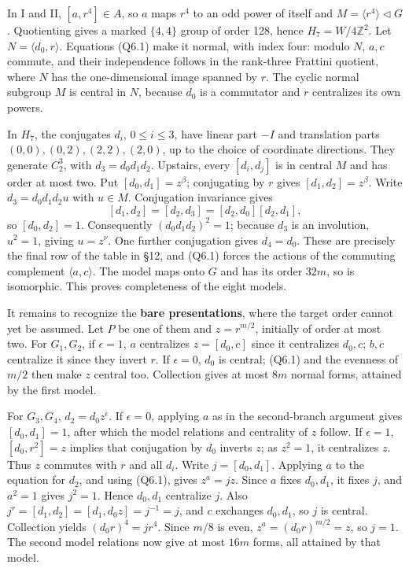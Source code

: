 \documentclass[
  10pt,
  letterpaper,
]{article}
\begin{document}
In I and II, \([a,r^4]\in A\), so \(a\) maps \(r^4\) to an odd power of
itself and \(M=\langle r^4\rangle\lhd G\). Quotienting gives a marked
\(\{4,4\}\) group of order 128, hence \(H_7=W/4\mathbb Z^2\). Let
\(N=\langle d_0,r\rangle\). Equations (Q6.1) make it normal, with index
four: modulo \(N\), \(a,c\) commute, and their independence follows in
the rank-three Frattini quotient, where \(N\) has the one-dimensional
image spanned by \(r\). The cyclic normal subgroup \(M\) is central in
\(N\), because \(d_0\) is a commutator and \(r\) centralizes its own
powers.

In \(H_7\), the conjugates \(d_i\), \(0\le i\le3\), have linear part
\(-I\) and translation parts \((0,0),(0,2),(2,2),(2,0)\), up to the
choice of coordinate directions. They generate \(C_2^3\), with
\(d_3=d_0d_1d_2\). Upstairs, every \([d_i,d_j]\) is in central \(M\) and
has order at most two. Put \([d_0,d_1]=z^\beta\); conjugating by \(r\)
gives \([d_1,d_2]=z^\beta\). Write \(d_3=d_0d_1d_2u\) with \(u\in M\).
Conjugation invariance gives \[
 [d_1,d_2]=[d_2,d_3]=[d_2,d_0][d_2,d_1],
\] so \([d_0,d_2]=1\). Consequently \((d_0d_1d_2)^2=1\); because \(d_3\)
is an involution, \(u^2=1\), giving \(u=z^\nu\). One further conjugation
gives \(d_4=d_0\). These are precisely the final row of the table in
§12, and (Q6.1) forces the actions of the commuting complement
\(\langle a,c\rangle\). The model maps onto \(G\) and has its order
\(32m\), so is isomorphic. This proves completeness of the eight models.

It remains to recognize the \textbf{bare presentations}, where the
target order cannot yet be assumed. Let \(P\) be one of them and
\(z=r^{m/2}\), initially of order at most two. For \(G_1,G_2\), if
\(\epsilon=1\), \(a\) centralizes \(z=[d_0,c]\) since it centralizes
\(d_0,c\); \(b,c\) centralize it since they invert \(r\). If
\(\epsilon=0\), \(d_0\) is central; (Q6.1) and the evenness of \(m/2\)
then make \(z\) central too. Collection gives at most \(8m\) normal
forms, attained by the first model.

For \(G_3,G_4\), \(d_2=d_0z^\epsilon\). If \(\epsilon=0\), applying
\(a\) as in the second-branch argument gives \([d_0,d_1]=1\), after
which the model relations and centrality of \(z\) follow. If
\(\epsilon=1\), \([d_0,r^2]=z\) implies that conjugation by \(d_0\)
inverts \(z\); as \(z^2=1\), it centralizes \(z\). Thus \(z\) commutes
with \(r\) and all \(d_i\). Write \(j=[d_0,d_1]\). Applying \(a\) to the
equation for \(d_2\), and using (Q6.1), gives \(z^a=jz\). Since \(a\)
fixes \(d_0,d_1\), it fixes \(j\), and \(a^2=1\) gives \(j^2=1\). Hence
\(d_0,d_1\) centralize \(j\). Also
\(j^r=[d_1,d_2]=[d_1,d_0z]=j^{-1}=j\), and \(c\) exchanges \(d_0,d_1\),
so \(j\) is central. Collection yields \((d_0r)^4=j r^4\). Since \(m/8\)
is even, \(z^a=(d_0r)^{m/2}=z\), so \(j=1\). The second model relations
now give at most \(16m\) forms, all attained by that model.
\end{document}
